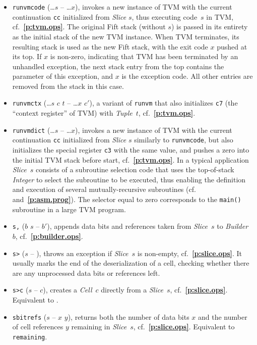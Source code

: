 \documentclass[12pt,oneside]{article}
\def\refpoint#1{{\rm\textbf{\ref{#1}}}}
\let\ptref=\refpoint
\begin{document}
\begin{itemize}
\item {\tt runvmcode} (\dots $s$ -- \dots $x$), invokes a new instance of TVM with the current continuation {\tt cc} initialized from {\em Slice\/} $s$, thus executing code~$s$ in TVM, cf.~\ptref{p:tvm.ops}. The original Fift stack (without $s$) is passed in its entirety as the initial stack of the new TVM instance. When TVM terminates, its resulting stack is used as the new Fift stack, with the exit code $x$ pushed at its top. If $x$ is non-zero, indicating that TVM has been terminated by an unhandled exception, the next stack entry from the top contains the parameter of this exception, and $x$ is the exception code. All other entries are removed from the stack in this case.
\item {\tt runvmctx} (\dots $s$ $c$ $t$ -- \dots $x$ $c'$), a variant of {\tt runvm} that also initializes {\tt c7} (the ``context register'' of TVM) with {\em Tuple\/}~$t$, cf.~\ptref{p:tvm.ops}.
\item {\tt runvmdict} (\dots $s$ -- \dots $x$), invokes a new instance of TVM with the current continuation {\tt cc} initialized from {\em Slice\/} $s$ similarly to {\tt runvmcode}, but also initializes the special register {\tt c3} with the same value, and pushes a zero into the initial TVM stack before start, cf.~\ptref{p:tvm.ops}. In a typical application {\em Slice\/}~$s$ consists of a subroutine selection code that uses the top-of-stack {\em Integer\/} to select the subroutine to be executed, thus enabling the definition and execution of several mutually-recursive subroutines (cf.~\cite[4.6]{TVM} and~\ptref{p:asm.prog}). The selector equal to zero corresponds to the {\tt main()} subroutine in a large TVM program.
\item {\tt s,} ($b$ $s$ -- $b'$), appends data bits and references taken from {\em Slice}~$s$ to {\em Builder}~$b$, cf.~\ptref{p:builder.ops}.
\item {\tt s>} ($s$ -- ), throws an exception if {\em Slice\/}~$s$ is non-empty, cf.~\ptref{p:slice.ops}. It usually marks the end of the deserialization of a cell, checking whether there are any unprocessed data bits or references left.
\item {\tt s>c} ($s$ -- $c$), creates a {\em Cell}~$c$ directly from a {\em Slice}~$s$, cf.~\ptref{p:slice.ops}. Equivalent to {\tt <b swap s, b>}.
\item {\tt sbitrefs} ($s$ -- $x$ $y$), returns both the number of data bits $x$ and the number of cell references $y$ remaining in {\em Slice}~$s$, cf.~\ptref{p:slice.ops}. Equivalent to {\tt remaining}.

\end{itemize}
\end{document}
